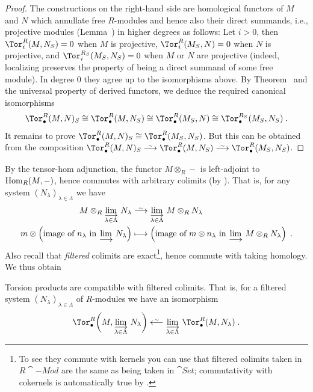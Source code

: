 \documentclass[a4paper,parskip=half,numbers=enddot, DIV=12]{scrreprt}
\begin{document}
\begin{proof}
	The constructions on the right-hand side are homological functors of $M$ and $N$ which annullate free $R$-modules and hence also their direct summands, i.e., projective modules (Lemma~) in higher degrees as follows: Let $i>0$, then $\Tor_i^R(M,N_S)=0$ when $M$ is projective, $\Tor_i^R(M_S,N)=0$ when $N$ is projective, and $\Tor_i^{R_S}(M_S,N_S)=0$ when $M$ or $N$ are projective (indeed, localizing preserves the property of being a direct summand of some free module). In degree $0$ they agree up to the isomorphisms above. By Theorem~ and the universal property of derived functors, we deduce the required canonical isomorphisms
	\begin{align*}
		\Tor_\bullet^R(M,N)_S\cong \Tor_\bullet^R(M,N_S)\cong \Tor_\bullet^R(M_S,N) \cong \Tor_\bullet^{R_S}(M_S,N_S)\;.
	\end{align*}
	It remains to prove $\Tor_\bullet^R(M,N)_S\cong \Tor_\bullet^R(M_S,N_S)$. But this can be obtained from the composition $\Tor_\bullet^R(M,N)_S\isomorphism \Tor_\bullet^R(M,N_S)\isomorphism \Tor_\bullet^R(M_S,N_S)$.
\end{proof}
By the tensor-hom adjunction, the functor $M\otimes_R-$ is left-adjoint to $\operatorname{Hom}_R(M,-)$, hence commutes with arbitrary colimits (by \cite[Corollary~A.1.1]{alggeo2}). That is, for any system $(N_\lambda)_{\lambda\in\Lambda}$ we have
\begin{align*}
	M\otimes_R\colimit[\lambda\in\Lambda]N_\lambda&\isomorphism \colimit[\lambda\in\Lambda]M\otimes_RN_\lambda\\
	m\otimes\left(\text{image of }n_\lambda\text{ in }\colimit N_\lambda\right)&\longmapsto \left(\text{image of }m\otimes n_\lambda\text{ in }\colimit M\otimes_RN_\lambda\right)\;.
\end{align*}
Also recall that \emph{filtered} colimits are exact\footnote{To see they commute with kernels you can use that filtered colimits taken in $R\cat{-Mod}$ are the same as being taken in $\cat{Set}$; commutativity with cokernels is automatically true by \cite[Corollary~A.1.1]{alggeo2}.}, hence commute with taking homology. We thus obtain
\begin{fact}
	Torsion products are compatible with filtered colimits. That is, for a filtered system $(N_\lambda)_{\lambda\in\Lambda}$ of $R$-modules we have an isomorphism
	\begin{align*}
		\Tor_\bullet^R\bigg(M,\colimit[\lambda\in\Lambda]N_\lambda\bigg)\lisomorphism \colimit[\lambda\in\Lambda]\Tor_\bullet^R(M,N_\lambda)\;.
	\end{align*}
\end{fact}
\end{document}
